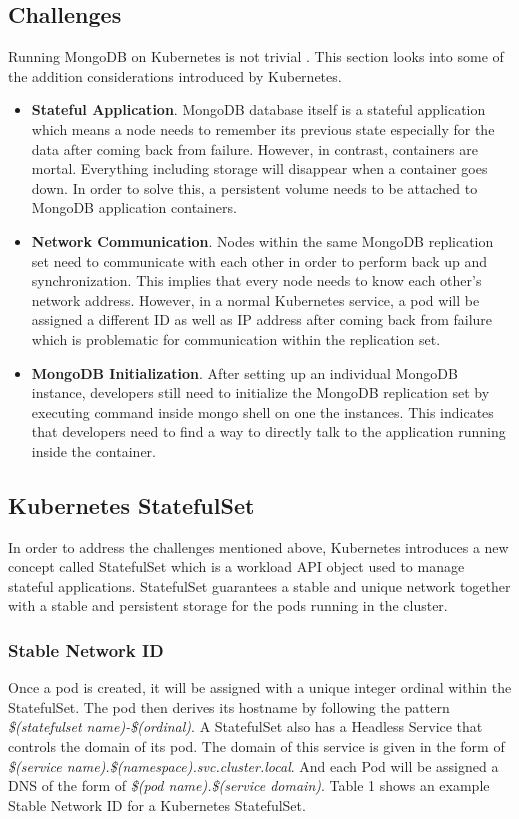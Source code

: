 \documentclass[sigconf]{acmart}
\begin{document}
\subsection{Challenges}
Running MongoDB on Kubernetes is not trivial \cite{mongoDBMicroservice}. This section looks into some of the addition considerations introduced by Kubernetes.
\begin{itemize}
    \item \textbf{Stateful Application}. MongoDB database itself is a stateful application which means a node needs to remember its previous state especially for the data after coming back from failure. However, in contrast, containers are mortal. Everything including storage will disappear when a container goes down. In order to solve this, a persistent volume needs to be attached to MongoDB application containers.  
    \item \textbf{Network Communication}. Nodes within the same MongoDB replication set need to communicate with each other in order to perform back up and synchronization. This implies that every node needs to know each other's network address. However, in a normal Kubernetes service, a pod will be assigned a different ID as well as IP address after coming back from failure which is problematic for communication within the replication set.
    \item \textbf{MongoDB Initialization}. After setting up an individual MongoDB instance, developers still need to initialize the MongoDB replication set by executing command inside mongo shell on one the instances. This indicates that developers need to find a way to directly talk to the application running inside the container.
\end{itemize}


\subsection{Kubernetes StatefulSet}
In order to address the challenges mentioned above, Kubernetes introduces a new concept called StatefulSet\cite{StatefulSets} which is a workload API object used to manage stateful applications. StatefulSet guarantees a stable and unique network together with a stable and persistent storage for the pods running in the cluster.

\subsubsection{Stable Network ID}
Once a pod is created, it will be assigned with a unique integer ordinal within the StatefulSet. The pod then derives its hostname by following the pattern \emph{ \$(statefulset name)-\$(ordinal)}. A StatefulSet also has a Headless Service that controls the domain of its pod. The domain of this service is given in the form of\emph{ \$(service name).\$(namespace).svc.cluster.local}. And each Pod will be assigned a DNS of the form of \emph{\$(pod name).\$(service domain)}. Table 1 shows an example Stable Network ID for a Kubernetes StatefulSet. 
\end{document}
